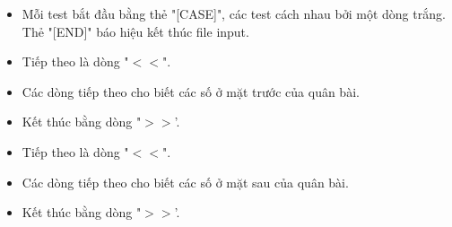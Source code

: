 \begin{itemize}
	\item     Mỗi test bắt đầu bằng thẻ "[CASE]", các test cách nhau bởi một dòng trắng. Thẻ "[END]" báo hiệu kết thúc file input.   
	\item     Tiếp theo là dòng "$<$$<$".   
	\item     Các dòng tiếp theo cho biết các số ở mặt trước của quân bài.   
	\item     Kết thúc bằng dòng "$>$$>$'.   
	\item     Tiếp theo là dòng "$<$$<$".   
	\item     Các dòng tiếp theo cho biết các số ở mặt sau của quân bài.   
	\item     Kết thúc bằng dòng "$>$$>$'.   
\end{itemize}